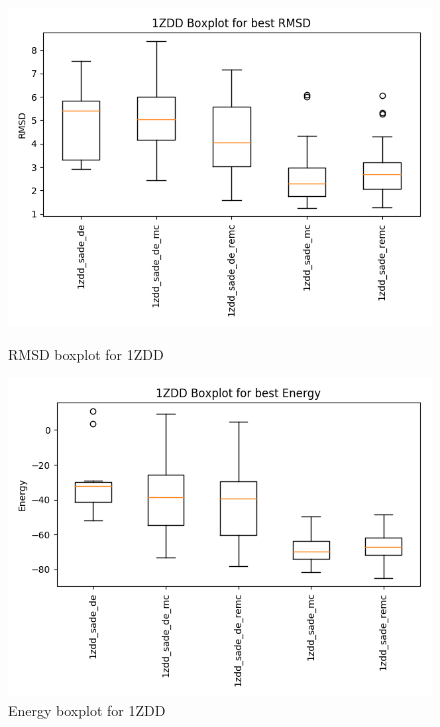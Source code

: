 

\begin{figure}[ht]
    \begin{minipage}[b]{0.45\linewidth}
        \centering
        \includegraphics[width=\textwidth]{Figuras/boxplots/1zdd_rmsd_boxplot.png}
        \caption{RMSD boxplot for 1ZDD}
        \label{fig:1zdd-rmsd-boxplot}
    \end{minipage}
    \hspace{0.5cm}
    \begin{minipage}[b]{0.45\linewidth}
        \centering
        \includegraphics[width=\textwidth]{Figuras/boxplots/1zdd_energy_boxplot.png}
        \caption{Energy boxplot for 1ZDD}
        \label{fig:1zdd-energy-boxplot}
    \end{minipage}
\end{figure}

